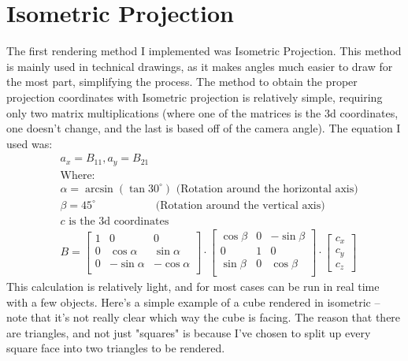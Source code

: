 \documentclass[12pt]{article}
\begin{document}
	\section{Isometric Projection}
	The first rendering method I implemented was Isometric Projection. This method is mainly used in technical drawings, as it makes angles much easier to draw for the most part, simplifying the process.
	The method to obtain the proper projection coordinates with Isometric projection is relatively simple, requiring only two matrix multiplications (where one of the matrices is the 3d coordinates, one doesn't change, and the last is based off of the camera angle). The equation I used was: 
	\begin{align*}
		&a_x=B_{11},a_y=B_{21}\\
		&\text{Where: }\\&\alpha=\arcsin{\left(\tan{30^\circ}\right)}\text{ (Rotation around the horizontal axis)}\\
		&\beta=45^\circ\hspace{61pt}\text{ (Rotation around the vertical axis)}\\
		&c \text{ is the 3d coordinates}\\
		&B=\left[ {\begin{array}{ccc}
				1 & 0 & 0 \\
				0 & \cos\alpha & \sin\alpha \\
				0 & -\sin\alpha & -\cos\alpha \\
		\end{array} } \right]
		\cdot 
		\left[ {\begin{array}{ccc}
				\cos\beta & 0 & -\sin\beta \\
				0 & 1 & 0 \\
				\sin\beta & 0 & \cos\beta \\
		\end{array} } \right]
		\cdot
		\left[ {\begin{array}{c}
			c_x \\ c_y \\c_z
		\end{array} } \right]
	\end{align*}
	This calculation is relatively light, and for most cases can be run in real time with a few objects. Here's a simple example of a cube rendered in isometric -- note that it's not really clear which way the cube is facing. The reason that there are triangles, and not just "squares" is because I've chosen to split up every square face into two triangles to be rendered.\\
\end{document}
